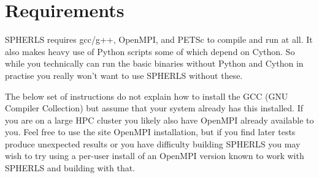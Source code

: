 \documentclass[12pt,a4paper]{book}
\begin{document}
\section{Requirements}
SPHERLS requires gcc/g++, OpenMPI, and PETSc to compile and run at all. It also makes heavy use of Python scripts some of which depend on Cython. So while you technically can run the basic binaries without Python and Cython in practise you really won't want to use SPHERLS without these.

The below set of instructions do not explain how to install the GCC (GNU Compiler Collection) but assume that your system already has this installed. If you are on a large HPC cluster you likely also have OpenMPI already available to you. Feel free to use the site OpenMPI installation, but if you find later tests produce unexpected results or you have difficulty building SPHERLS you may wish to try using a per-user install of an OpenMPI version known to work with SPHERLS and building with that.
\end{document}
